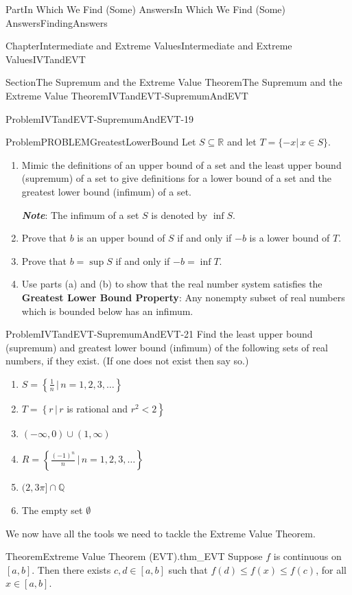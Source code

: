 \documentclass[oneside,10pt,]{book}
\newcommand{\alert}[1]{\textbf{\textit{#1}}}
\newcommand{\terminology}[1]{\textbf{#1}}
\numberwithin{equation}{part}
\newcommand{\RR}{\mathbb {R}}
\newcommand{\QQ}{\mathbb {Q}}
\newcommand{\lt}{<}
\begin{document}
\begin{partptx}{Part}{In Which We Find (Some) Answers}{}{In Which We Find (Some) Answers}{}{}{FindingAnswers}
\begin{chapterptx}{Chapter}{Intermediate and Extreme Values}{}{Intermediate and Extreme Values}{}{}{IVTandEVT}
\begin{sectionptx}{Section}{The Supremum and the Extreme Value Theorem}{}{The Supremum and the Extreme Value Theorem}{}{}{IVTandEVT-SupremumAndEVT}
\begin{problem}{Problem}{}{IVTandEVT-SupremumAndEVT-19}
\begin{enumerate}[font=\bfseries,label=(\alph*),ref=\alph*]
\end{enumerate}%
\end{problem}
\begin{problem}{Problem}{}{PROBLEMGreatestLowerBound}%
Let \(S\subseteq\RR\) and let \(T=\{-x|\,x\in S\}\).%
\begin{enumerate}[font=\bfseries,label=(\alph*),ref=\alph*]%
\item{}Mimic the definitions of an upper bound of a set and the least upper bound (supremum) of a set to give definitions for a lower bound of a set and the greatest lower bound (infimum) of a set.%
\par
\alert{Note}: The infimum of a set \(S\) is denoted by \(\inf S\).%
\item{}Prove that \(b\) is an upper bound of \(S\) if and only if \(-b\) is a lower bound of \(T\).%
\item{}Prove that \(b=\sup S\) if and only if \(-b=\inf T\).%
\item{}Use parts (a) and (b) to show that the real number system satisfies the \terminology{Greatest Lower Bound Property}: Any non\textendash{}empty subset of real numbers which is bounded below has an infimum.%
\end{enumerate}%
\end{problem}
\begin{problem}{Problem}{}{IVTandEVT-SupremumAndEVT-21}%
Find the least upper bound (supremum) and greatest lower bound (infimum) of the following sets of real numbers, if they exist. (If one does not exist then say so.)%
\begin{enumerate}[font=\bfseries,label=(\alph*),ref=\alph*]%
\item{}\(S=\left\{\frac{1}{n}\,|\,n=1,2,3,\ldots\right\}\)%
\item{}\(T=\left\{r\,|\,r\right.\) is rational and \(\left.r^2\lt 2\right\}\)%
\item{}\((-\infty,0)\cup(1,\infty)\)%
\item{}\(R=\left\{\frac{(-1)^n}{n}\,|\,n=1,2,3,\ldots\right\}\)%
\item{}\((2,3\pi]\cap\QQ\)%
\item{}The empty set \(\emptyset\)%
\end{enumerate}%
\end{problem}
We now have all the tools we need to tackle the Extreme Value Theorem.%
\begin{theorem}{Theorem}{Extreme Value Theorem (EVT).}{}{thm_EVT}%
%
Suppose \(f\) is continuous on \([a,b]\). Then there exists \(c,d\in[a,b]\) such that \(f(d)\leq f(x)\leq f(c)\), for all \(x\in[a,b]\).%

\end{theorem}
\end{sectionptx}
\end{chapterptx}
\end{partptx}
\end{document}
